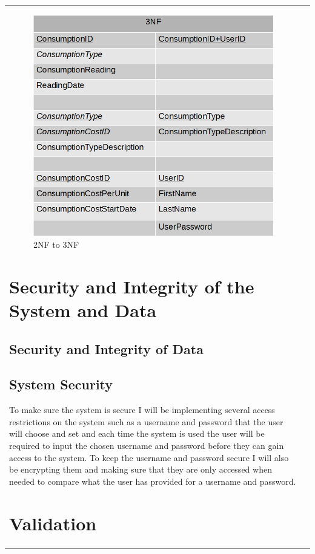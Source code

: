 \begin{center}
\begin{tabular}{|p{4.5cm}|p{4cm}}
\begin{figure}[H]
\includegraphics{./design/3NF.png}
\caption{2NF to 3NF}
\end{figure}

\section{Security and Integrity of the System and Data}

\subsection{Security and Integrity of Data}

\subsection{System Security}
To make sure the system is secure I will be implementing several access restrictions on the system such as a username and password that the user will choose and  set and each time the system is used the user will be required to input the chosen username and password before they can gain access to the system. To keep the username and password secure I will also be encrypting them and making sure that they are only accessed when needed to compare what the user has provided for a username and password.
\section{Validation}


\end{tabular}
\end{center}
